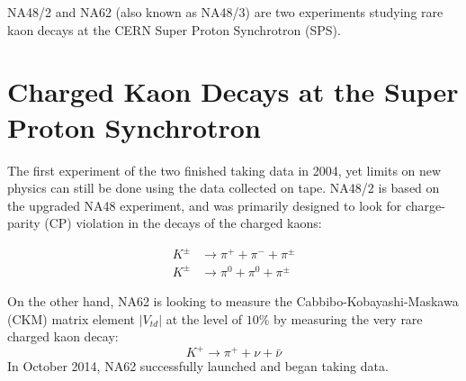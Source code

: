 NA48/2 \cite{Batley:1999fv} and NA62 \cite{Martellotti:2015kna} (also known as NA48/3) are two experiments studying rare kaon decays at the CERN Super Proton Synchrotron (SPS).
\section{Charged Kaon Decays at the Super Proton Synchrotron}
The first experiment of the two finished taking data in 2004, yet limits on new physics can still be done using the data collected on tape.
NA48/2 is based on the upgraded NA48 experiment, and was primarily designed to look for charge-parity (CP) violation in the decays of the charged kaons:

\begin{align}
K^\pm & \rightarrow \pi^+ + \pi^- + \pi^\pm \\
K^\pm & \rightarrow \pi^0 + \pi^0 + \pi^\pm
\end{align}

On the other hand, NA62 is looking to measure the Cabbibo-Kobayashi-Maskawa (CKM) matrix element $|V_{td}|$ at the level of $10\%$ by measuring the very rare charged kaon decay:
\begin{equation}
K^+ \rightarrow \pi^+ + \nu + \bar{\nu}
\end{equation}
In October 2014, NA62 successfully launched and began taking data.
